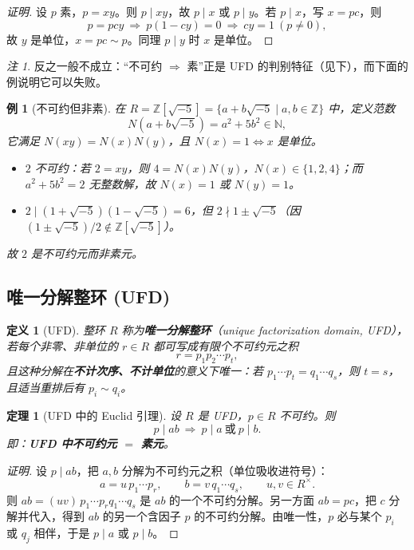 \documentclass[11pt,a4paper]{ctexart}
\newtheorem*{theorem}{定理}
\newtheorem*{definition}{定义}
\newtheorem*{example}{例}
\theoremstyle{remark}
\newtheorem*{remark}{注}
\begin{document}
\begin{proof}[证明]
设 $p$ 素，$p=xy$。则 $p\mid xy$，故 $p\mid x$ 或 $p\mid y$。若 $p\mid x$，写 $x=pc$，则
\[
p=pcy\ \Longrightarrow\ p(1-cy)=0\ \Longrightarrow\ cy=1\ (p\neq 0),
\]
故 $y$ 是单位，$x=pc\sim p$。同理 $p\mid y$ 时 $x$ 是单位。
\end{proof}

\begin{remark}
反之一般不成立：“不可约 $\Rightarrow$ 素”正是 UFD 的判别特征（见下），而下面的例说明它可以失败。
\end{remark}

\begin{example}[不可约但非素]
在 $R=\mathbb{Z}[\sqrt{-5}]=\{a+b\sqrt{-5}\mid a,b\in\mathbb{Z}\}$ 中，定义范数
\[
N(a+b\sqrt{-5})=a^{2}+5b^{2}\in\mathbb{N},
\]
它满足 $N(xy)=N(x)N(y)$，且 $N(x)=1\iff x$ 是单位。
\begin{itemize}
    \item $2$ 不可约：若 $2=xy$，则 $4=N(x)N(y)$，$N(x)\in\{1,2,4\}$；而 $a^{2}+5b^{2}=2$ 无整数解，故 $N(x)=1$ 或 $N(y)=1$。
    \item $2\mid (1+\sqrt{-5})(1-\sqrt{-5})=6$，但 $2\nmid 1\pm\sqrt{-5}$（因 $(1\pm\sqrt{-5})/2\notin\mathbb{Z}[\sqrt{-5}]$）。
\end{itemize}
故 $2$ 是不可约元而非素元。
\end{example}

\subsection*{唯一分解整环 (UFD)}

\begin{definition}[UFD]
整环 $R$ 称为\textbf{唯一分解整环}（unique factorization domain, UFD），若每个非零、非单位的 $r\in R$ 都可写成有限个不可约元之积
\[
r=p_1p_2\cdots p_t ,
\]
且这种分解在\textbf{不计次序、不计单位}的意义下唯一：若 $p_1\cdots p_t=q_1\cdots q_s$，则 $t=s$，且适当重排后有 $p_i\sim q_i$。
\end{definition}

\begin{theorem}[UFD 中的 Euclid 引理]
设 $R$ 是 UFD，$p\in R$ 不可约。则
\[
p\mid ab\ \Longrightarrow\ p\mid a\ \text{或}\ p\mid b .
\]
即：\textbf{UFD 中不可约元 $=$ 素元}。
\end{theorem}

\begin{proof}[证明]
设 $p\mid ab$，把 $a,b$ 分解为不可约元之积（单位吸收进符号）：
\[
a=u\,p_1\cdots p_r,\qquad b=v\,q_1\cdots q_s ,\qquad u,v\in R^{\times}.
\]
则 $ab=(uv)\,p_1\cdots p_r q_1\cdots q_s$ 是 $ab$ 的一个不可约分解。另一方面 $ab=pc$，把 $c$ 分解并代入，得到 $ab$ 的另一个含因子 $p$ 的不可约分解。由唯一性，$p$ 必与某个 $p_i$ 或 $q_j$ 相伴，于是 $p\mid a$ 或 $p\mid b$。
\end{proof}
\end{document}
